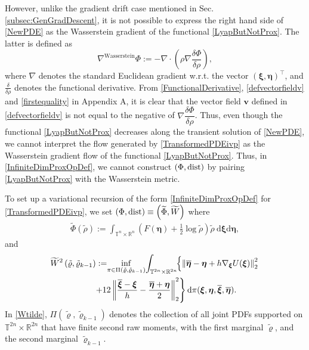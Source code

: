 \documentclass[10pt,twocolumn]{IEEEtran}
\begin{document}
However, unlike the gradient drift case mentioned in Sec. \ref{subsec:GenGradDescent}, it is not possible to express the right hand side of \eqref{NewPDE} as the Wasserstein gradient of the functional \eqref{LyapButNotProx}. The latter is defined as \cite[Ch. 8]{ambrosio2008gradient} 
$$\nabla^{\text{Wasserstein}}\Phi := -\nabla\cdot\left(\rho\nabla\dfrac{\delta\Phi}{\delta\rho}\right),$$
where $\nabla$ denotes the standard Euclidean gradient w.r.t. the vector $(\bm{\xi},\bm{\eta})^{\top}$, and $\frac{\delta}{\delta\rho}$ denotes the functional derivative. From \eqref{FunctionalDerivative}, \eqref{defvectorfieldv} and \eqref{firstequality} in Appendix A, it is clear that the vector field $\bm{v}$ defined in \eqref{defvectorfieldv} is not equal to the negative of $\nabla\dfrac{\delta\Phi}{\delta\rho}$. Thus, even though the functional \eqref{LyapButNotProx} decreases along the transient solution of \eqref{NewPDE}, we cannot interpret the flow generated by \eqref{TransformedPDEivp} as the Wasserstein gradient flow of the functional \eqref{LyapButNotProx}. Thus, in \eqref{InfiniteDimProxOpDef}, we cannot construct $(\Phi,{\rm{dist}})$ by pairing \eqref{LyapButNotProx} with the Wasserstein metric.

To set up a variational recursion of the form \eqref{InfiniteDimProxOpDef} for \eqref{TransformedPDEivp}, we set $(\Phi,{\rm{dist}}) \equiv \left(\widetilde{\Phi},\widetilde{W}\right)$ where
\begin{align}
\widetilde{\Phi}(\tilde{\rho}) := \int_{\mathbb{T}^{n} \times \mathbb{R}^{n}}\left(F(\boldsymbol{\eta})+\frac{1}{2} \log \tilde{\rho}\right) \tilde{\rho}\: \mathrm{d} \boldsymbol{\xi} \mathrm{d} \boldsymbol{\eta},
\label{Phitilde}	
\end{align}
and 
\begin{align}
\widetilde{W}^{2}\left(\tilde{\varrho}, \tilde{\varrho}_{k-1}\right):=\!&\inf _{\pi \in \Pi\left(\tilde{\varrho}, \tilde{\varrho}_{k-1}\right)}\!\int_{\mathbb{T}^{2 n} \times \mathbb{R}^{2 n}}\!\!\left\{\left\|\overline{\boldsymbol{\eta}}-\boldsymbol{\eta}+h \nabla_{\boldsymbol{\xi}} U(\boldsymbol{\xi})\right\|_{2}^{2}\right.\nonumber\\
&\hspace*{-0.2in}\left.+12\left\|\frac{\overline{\boldsymbol{\xi}}-\boldsymbol{\xi}}{h}-\frac{\overline{\boldsymbol{\eta}}+\boldsymbol{\eta}}{2}\right\|_{2}^{2}\right\} \mathrm{d} \pi(\boldsymbol{\xi}, \boldsymbol{\eta}, \overline{\boldsymbol{\xi}}, \overline{\boldsymbol{\eta}}).
\label{Wtilde}	
\end{align}
In \eqref{Wtilde}, $\Pi\left(\tilde{\varrho}, \tilde{\varrho}_{k-1}\right)$ denotes the collection of all joint PDFs supported on $\mathbb{T}^{2 n} \times \mathbb{R}^{2 n}$ that have finite second raw moments, with the first marginal $\tilde{\varrho}$, and the second marginal $\tilde{\varrho}_{k-1}$.
\end{document}
